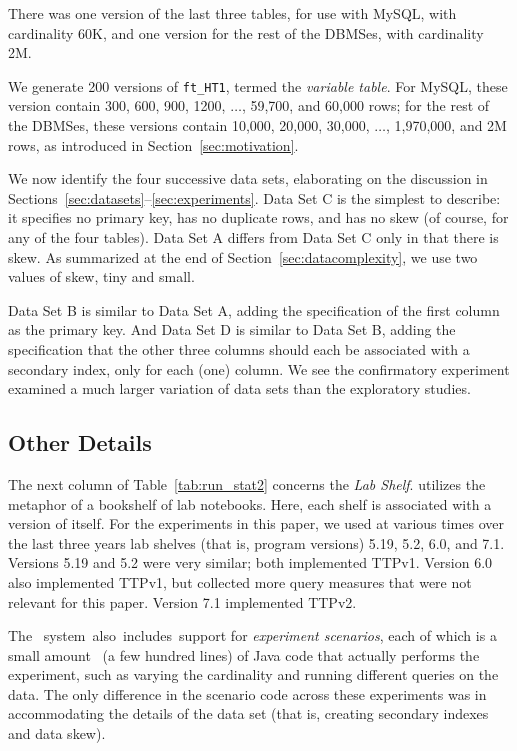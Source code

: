 \documentclass[prodmode,acmtods]{acmsmall}
\def\azdb{\doubleblind{\hbox{\sc AZDBLab}}{\hbox{\sc DBLab}}}
\begin{document}
There was one version of the
last three tables, for use with MySQL, with cardinality 60K, and one version
for the rest of the DBMSes, with cardinality 2M.

We generate 200 versions of {\tt ft\_HT1}, termed the {\em variable table}. For MySQL, these version contain
300, 600, 900, 1200, $\ldots$, 59,700, and 60,000 rows; for the rest of the
DBMSes, these versions contain 10,000, 20,000, 30,000, $\ldots$, 1,970,000,
and 2M rows, as introduced in Section~\ref{sec:motivation}.

We now identify the four successive data sets, elaborating on the discussion in Sections~\ref{sec:datasets}--\ref{sec:experiments}. Data Set C is the simplest to
describe: it specifies no primary key, has no duplicate rows, and has no skew
(of course, for any of the four tables). Data Set A differs from Data Set C
only in that there is skew.  As summarized at the end of
Section~\ref{sec:datacomplexity}, we use two values of skew, tiny and small.

Data Set B is similar to Data Set A, adding the specification of the first
column as the primary key. And Data Set D is similar to Data Set B, adding
the specification that the other three columns should each be associated
with a secondary index, only for each (one) column.
We see the confirmatory experiment examined a much larger variation of data sets than
the exploratory studies.

\subsection{Other Details}\label{sec:otherdetails}
The next column of Table~\ref{tab:run_stat2} concerns the {\em Lab
  Shelf}. \hbox{\azdb} utilizes the metaphor of a bookshelf of lab
notebooks. Here, each shelf is associated with a version of \hbox{\azdb} itself. For the experiments in this paper, we used at various times over
the last three years lab shelves (that is, program versions) 5.19, 5.2,
6.0, and 7.1. Versions 5.19 and 5.2 were very similar; both implemented
TTPv1.  Version 6.0 also implemented TTPv1, but collected more query
measures that were not relevant for this paper. Version 7.1 implemented
TTPv2.

The \hbox{\azdb\ system also includes support} for {\em experiment
  scenarios}, each of which
is a small amount~ (a few hundred lines) of Java code that actually performs the experiment, such as varying the
cardinality and running different queries on the data. The only difference
in the scenario code across these experiments was in accommodating the
details of the data set (that is, creating secondary indexes and data skew).
\end{document}
